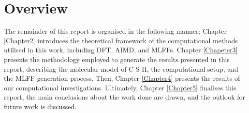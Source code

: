 \section{Overview}
The remainder of this report is organised in the following manner: Chapter \ref{Chapter2} introduces the theoretical framework of the computational methods utilised in this work, including DFT, AIMD, and MLFFs. Chapter \ref{Chapeter3} presents the methodology employed to generate the results presented in this report, describing the molecular model of C-S-H, the computational setup, and the MLFF generation process. Then, Chapter \ref{Chapter4} presents the results of our computational investigations. Ultimately, Chapter \ref{Chapter5} finalises this report, the main conclusions about the work done are drawn, and the outlook for future work is discussed.




